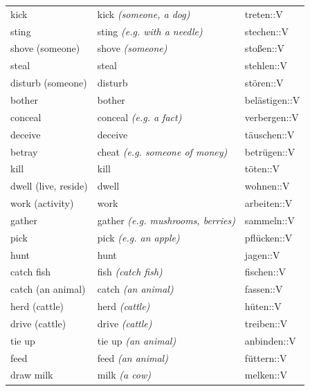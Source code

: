 \begin{center}
\begin{longtable}{lll}
{\sc \lowercase{	KICK	}}	&	kick	\textit{\footnotesize (someone, a dog)}	&	treten::V	\\
{\sc \lowercase{	STING	}}	&	sting	\textit{\footnotesize (e.g. with a needle)}	&	stechen::V	\\
{\sc \lowercase{	SHOVE \footnotesize (SOMEONE)	}}	&	shove	\textit{\footnotesize (someone)}	&	stoßen::V	\\
{\sc \lowercase{	STEAL	}}	&	steal		&	stehlen::V	\\
{\sc \lowercase{	DISTURB \footnotesize (SOMEONE)	}}	&	disturb		&	stören::V	\\
{\sc \lowercase{	BOTHER	}}	&	bother		&	belästigen::V	\\
{\sc \lowercase{	CONCEAL	}}	&	conceal	\textit{\footnotesize (e.g. a fact)}	&	verbergen::V	\\
{\sc \lowercase{	DECEIVE	}}	&	deceive		&	täuschen::V	\\
{\sc \lowercase{	BETRAY	}}	&	cheat	\textit{\footnotesize (e.g. someone of money)}	&	betrügen::V	\\
{\sc \lowercase{	KILL	}}	&	kill		&	töten::V	\\
{\sc \lowercase{	DWELL \footnotesize (LIVE, RESIDE)	}}	&	dwell		&	wohnen::V	\\
{\sc \lowercase{	WORK \footnotesize (ACTIVITY)	}}	&	work		&	arbeiten::V	\\
{\sc \lowercase{	GATHER	}}	&	gather	\textit{\footnotesize (e.g. mushrooms, berries)}	&	sammeln::V	\\
{\sc \lowercase{	PICK	}}	&	pick	\textit{\footnotesize (e.g. an apple)}	&	pflücken::V	\\
{\sc \lowercase{	HUNT	}}	&	hunt		&	jagen::V	\\
{\sc \lowercase{	CATCH FISH	}}	&	fish	\textit{\footnotesize (catch fish)}	&	fischen::V	\\
{\sc \lowercase{	CATCH \footnotesize (AN ANIMAL)	}}	&	catch	\textit{\footnotesize (an animal)}	&	fassen::V	\\
{\sc \lowercase{	HERD \footnotesize (CATTLE)	}}	&	herd	\textit{\footnotesize (cattle)}	&	hüten::V	\\
{\sc \lowercase{	DRIVE \footnotesize (CATTLE)	}}	&	drive	\textit{\footnotesize (cattle)}	&	treiben::V	\\
{\sc \lowercase{	TIE UP	}}	&	tie up	\textit{\footnotesize (an animal)}	&	anbinden::V	\\
{\sc \lowercase{	FEED	}}	&	feed	\textit{\footnotesize (an animal)}	&	füttern::V	\\
{\sc \lowercase{	DRAW MILK	}}	&	milk	\textit{\footnotesize (a cow)}	&	melken::V	\\

\end{longtable}
\end{center}
